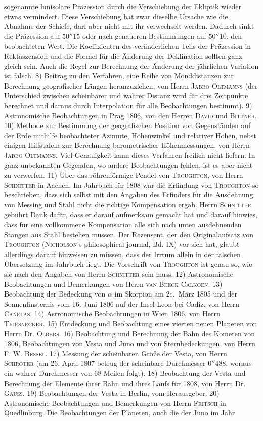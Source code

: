sogenannte lunisolare Präzession durch die Verschiebung der Ekliptik wieder etwas vermindert. Diese Verschiebung hat zwar dieselbe Ursache wie die Abnahme der Schiefe, darf aber nicht mit ihr verwechselt werden. Dadurch sinkt die Präzession auf $50''15$ oder nach genaueren Bestimmungen auf $50''10$, den beobachteten Wert. Die Koeffizienten des veränderlichen Teils der Präzession in Rektaszension und die Formel für die Änderung der Deklination sollten ganz gleich sein. Auch die Regel zur Berechnung der Änderung der jährlichen Variation ist falsch. 8) Beitrag zu den Verfahren, eine Reihe von Monddistanzen zur Berechnung geografischer Längen heranzuziehen, von Herrn \textsc{Jabbo Oltmanns} (der Unterschied zwischen scheinbarer und wahrer Distanz wird für drei Zeitpunkte berechnet und daraus durch Interpolation für alle Beobachtungen bestimmt). 9) Astronomische Beobachtungen in Prag 1806, von den Herren \textsc{David} und \textsc{Bittner}. 10) Methode zur Bestimmung der geografischen Position von Gegenständen auf der Erde mithilfe beobachteter Azimute, Höhenwinkel und relativer Höhen, nebst einigen Hilfstafeln zur Berechnung barometrischer Höhenmessungen, von Herrn \textsc{Jabbo Oltmanns}. Viel Genauigkeit kann dieses Verfahren freilich nicht liefern. In ganz unbekannten Gegenden, wo andere Beobachtungen fehlen, ist es aber nicht zu verwerfen. 11) Über das röhrenförmige Pendel von \textsc{Troughton}, von Herrn \textsc{Schnitter} in Aachen. Im Jahrbuch für 1808 war die Erfindung von \textsc{Troughton} so beschrieben, dass sich selbst mit den Angaben des Erfinders für die Ausdehnung von Messing und Stahl nicht die richtige Kompensation ergab. Herrn \textsc{Schnitter} gebührt Dank dafür, dass er darauf aufmerksam gemacht hat und darauf hinwies, dass für eine vollkommene Kompensation alle sich nach unten ausdehnenden Stangen aus Stahl bestehen müssen. Der Rezensent, der den Originalaufsatz von \textsc{Troughton} (\textsc{Nicholson}’s philosophical journal, Bd. IX) vor sich hat, glaubt allerdings darauf hinweisen zu müssen, dass der Irrtum allein in der falschen Übersetzung im Jahrbuch liegt. Die Vorschrift von \textsc{Troughton} ist genau so, wie sie nach den Angaben von Herrn \textsc{Schnitter} sein muss. 12) Astronomische Beobachtungen und Bemerkungen von Herrn \textsc{van Beeck Calkoen}. 13) Beobachtung der Bedeckung von $\alpha$ im Skorpion am 2c.\ März 1805 und der Sonnenfinsternis vom 16. Juni 1806 auf der Insel Leon bei Cadiz, von Herrn \textsc{Canelas}. 14) Astronomische Beobachtungen in Wien 1806, von Herrn \textsc{Triesnecker}. 15) Entdeckung und Beobachtung eines vierten neuen Planeten von Herrn Dr. \textsc{Olbers}. 16) Beobachtung und Berechnung der Bahn des Kometen von 1806, Beobachtungen von Vesta und Juno und von Sternbedeckungen, von Herrn F. W. \textsc{Bessel}. 17) Messung der scheinbaren Größe der Vesta, von Herrn \textsc{Schröter} (am 26. April 1807 betrug der scheinbare Durchmesser $0''488$, woraus ein wahrer Durchmesser von 68 Meilen folgt). 18) Beobachtung der Vesta und Berechnung der Elemente ihrer Bahn und ihres Laufs für 1808, von Herrn Dr. \textsc{Gauss}. 19) Beobachtungen der Vesta in Berlin, vom Herausgeber. 20) Astronomische Beobachtungen und Bemerkungen von Herrn \textsc{Fritsch} in Quedlinburg. Die Beobachtungen der Planeten, auch die der Juno im Jahr 